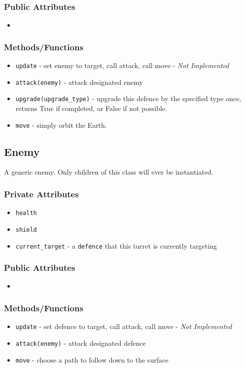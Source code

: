 \documentclass[12pt]{article}
\begin{document}
\subsubsection*{Public Attributes}
\begin{itemize}
\item 
\end{itemize}
\subsubsection*{Methods/Functions}
\begin{itemize}
\item \texttt{update} - set enemy to target, call attack, call move - 
\textit{Not Implemented}
\item \texttt{attack(enemy)} - attack designated enemy
\item \texttt{upgrade(upgrade\_type)} - upgrade this defence by the specified
type once, returns True if completed, or False if not possible.
\item \texttt{move} - simply orbit the Earth.
\end{itemize}

\subsection*{Enemy} A generic enemy. Only children of this class will ever
be instantiated.
\subsubsection*{Private Attributes}
\begin{itemize}
\item \texttt{health}
\item \texttt{shield}
\item \texttt{current\_target} - a \texttt{defence} that this turret is
currently targeting
\end{itemize}
\subsubsection*{Public Attributes}
\begin{itemize}
\item 
\end{itemize}
\subsubsection*{Methods/Functions}
\begin{itemize}
\item \texttt{update} - set defence to target, call attack, call move - 
\textit{Not Implemented}
\item \texttt{attack(enemy)} - attack designated defence
\item \texttt{move} - choose a path to follow down to the surface
\end{itemize}
\end{document}
